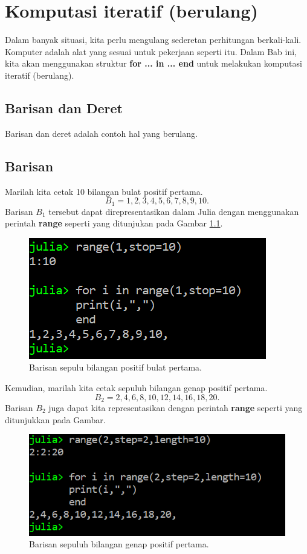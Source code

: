\documentclass[12pt,a4paper]{memoir}
\begin{document}
\chapter{Komputasi iteratif (berulang)}
Dalam banyak situasi, kita perlu mengulang sederetan perhitungan berkali-kali. Komputer adalah alat yang sesuai untuk pekerjaan seperti itu. Dalam Bab ini, kita akan menggunakan struktur \textbf{for ... in ... end} untuk melakukan komputasi iteratif (berulang).

\section{Barisan dan Deret}
Barisan dan deret adalah contoh hal yang berulang.
\section{Barisan}
Marilah kita cetak 10 bilangan bulat positif pertama.
\begin{equation*}
B_1 =1,2,3,4,5,6,7,8,9,10.
\end{equation*}
Barisan $B_1$ tersebut dapat direpresentasikan dalam Julia dengan menggunakan perintah \textbf{range} seperti yang ditunjukan pada Gambar \ref{fig:barisan1}. 
\begin{figure}[h]
	\centering
	\includegraphics{images/barisan1}
	\caption{Barisan sepulu bilangan positif bulat pertama.}
	\label{fig:barisan1}
\end{figure}


Kemudian, marilah kita cetak sepuluh bilangan genap positif pertama.
\begin{equation*}
B_2 = 2,4,6,8,10,12,14,16,18,20.
\end{equation*}
Barisan $B_2$ juga dapat kita representasikan dengan perintah \textbf{range} seperti yang ditunjukkan pada Gambar.
\begin{figure}[h]
	\centering
	\includegraphics{images/barisan2}
	\caption{Barisan sepuluh bilangan genap positif pertama.}
	\label{fig:barisan2}
\end{figure}
\end{document}
